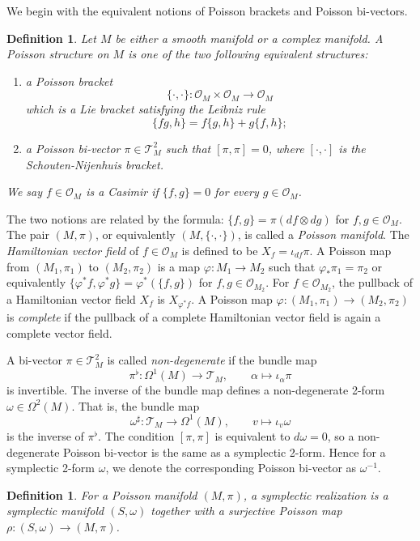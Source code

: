 \documentclass{amsart}
\newtheorem{definition}[theorem]{Definition}
\numberwithin{equation}{section}
\newcommand{\cO}{\mathcal{O}}
\newcommand{\cT}{\mathcal{T}}
\begin{document}
We begin with the equivalent notions of Poisson brackets and Poisson bi-vectors.
\begin{definition} 
  \label{def: PoissonMfld}
  Let $M$ be either a smooth manifold or a complex manifold.
  A \emph{Poisson structure} on $M$ is one of the two following equivalent structures:
  \begin{enumerate}
    \item a \emph{Poisson bracket}
      $$\{\cdot, \cdot\}: \cO_M \times \cO_M \to \cO_M$$
      which is a Lie bracket satisfying the Leibniz rule
      $$\{fg, h\} = f\{g,h\} + g\{f,h\};$$
    \item a \emph{Poisson bi-vector} $\pi \in \cT^2_M$ such that $[\pi, \pi] = 0$, where $[\cdot, \cdot]$ is the Schouten-Nijenhuis bracket.
  \end{enumerate}
  We say $f \in \cO_M$ is a Casimir if $\{f, g\} = 0$ for every $g\in \cO_M$.
\end{definition}

The two notions are related by the formula: $\{f, g\} = \pi (df \otimes dg)$ for $f, g\in \cO_M$.
The pair $(M, \pi)$, or equivalently $(M, \{\cdot,\cdot\})$, is called a \emph{Poisson manifold}.
The \emph{Hamiltonian vector field} of $f \in \cO_M$ is defined to be $X_f = \iota_{df}\pi$.
A Poisson map from $(M_1, \pi_1)$ to $(M_2, \pi_2)$ is a map $\varphi: M_1\to M_2$ such that $\varphi_*\pi_1 = \pi_2$ or equivalently $\{\varphi^*f, \varphi^*g\} = \varphi^*(\{f, g\})$ for $f, g \in \cO_{M_2}$.
For $f \in \cO_{M_2}$, the pullback of a Hamiltonian vector field $X_f$ is $X_{\varphi^*f}$.
A Poisson map $\varphi: (M_1, \pi_1) \to (M_2, \pi_2)$ is \emph{complete} if the pullback of a complete Hamiltonian vector field is again a complete vector field.

A bi-vector $\pi \in \cT^2_M$ is called \emph{non-degenerate} if the bundle map
\[\pi^\flat: \Omega^1(M) \to \cT_M, \qquad \alpha \mapsto \iota_\alpha \pi\]
is invertible.
The inverse of the bundle map defines a non-degenerate 2-form $\omega \in \Omega^2(M)$.
That is, the bundle map
\[\omega^\sharp: \cT_M \to \Omega^1(M), \qquad v \mapsto \iota_v \omega\]
is the inverse of $\pi^\flat$.
The condition $[\pi,\pi]$ is equivalent to $d\omega = 0$, so a non-degenerate Poisson bi-vector is the same as a symplectic 2-form.
Hence for a symplectic 2-form $\omega$, we denote the corresponding Poisson bi-vector as $\omega^{-1}$.

\begin{definition}
  For a Poisson manifold $(M, \pi)$, a symplectic realization is a symplectic manifold $(S, \omega)$ together with a surjective Poisson map $\rho: (S, \omega) \to (M, \pi)$.
\end{definition}
\end{document}
